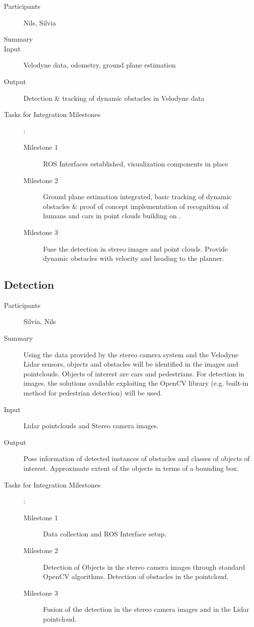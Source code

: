 \documentclass[11pt,a4paper]{article}
\begin{document}
\begin{description}
\item[Participants] Nils, Silvia
\item[Summary]
\item[Input] Velodyne data, odometry, ground plane estimation
\item[Output] Detection \& tracking of dynamic obstacles in Velodyne data
\item[Tasks for Integration Milestones]:\
	\begin{description}
		\item[Milestone 1] ROS Interfaces established, visualization components in place
		\item[Milestone 2] Ground plane estimation integrated, basic tracking of dynamic obstacles \&
						   proof of concept implementation of recognition of humans and cars in point clouds building on \cite{}.
		\item[Milestone 3] Fuse the detection in stereo images and point clouds. Provide dynamic obstacles
						   with velocity and heading to the planner.
	\end{description}	 
\end{description}

\subsection{Detection} %

\begin{description}
\item[Participants] Silvia, Nils
\item[Summary]
	Using the data provided by the stereo camera system and the Velodyne Lidar sensors, objects and obstacles will be identified in the images and pointclouds. Objects of interest are cars and pedestrians. For detection in images, the solutions available exploiting the OpenCV library (e.g. built-in method for pedestrian detection) will be used. 
\item[Input]
	Lidar pointclouds and Stereo camera images.
\item[Output]
	Pose information of detected instances of obstacles and classes of objects of interest. Approximate extent of the objects in terms of a bounding box.
\item[Tasks for Integration Milestones]:\
	\begin{description}
		\item[Milestone 1]
			Data collection and ROS Interface setup.
		\item[Milestone 2]
			Detection of Objects in the stereo camera images through standard OpenCV algorithms. Detection of obstacles in the pointcloud.
		\item[Milestone 3]
			Fusion of the detection in the stereo camera images and in the Lidar pointcloud.
	\end{description}	 
\end{description}
\end{document}

